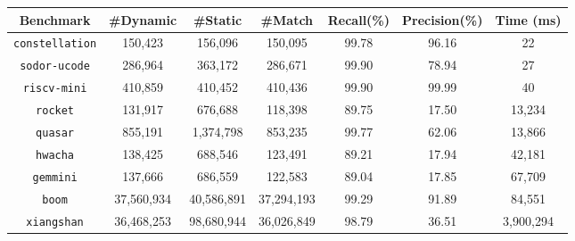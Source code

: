 \begin{tabular}{ccccccc}
\toprule
\textbf{Benchmark} & \textbf{\#Dynamic} & \textbf{\#Static} &  \textbf{\#Match} & \textbf{Recall(\%)} & \textbf{Precision(\%)} & \textbf{Time (ms)} \\
\midrule
\texttt{constellation} & 150,423 & 156,096 & 150,095 & 99.78 & 96.16 & 22 \\
\texttt{sodor-ucode} & 286,964 & 363,172 & 286,671 &  99.90 & 78.94 & 27\\
\texttt{riscv-mini} & 410,859 & 410,452 & 410,436 &  99.90  & 99.99 & 40\\
\texttt{rocket} & 131,917 & 676,688 & 118,398 & 89.75 &  17.50 & 13,234 \\
\texttt{quasar} & 855,191 & 1,374,798 & 853,235 &  99.77 & 62.06 & 13,866\\
\texttt{hwacha} & 138,425 & 688,546 & 123,491 & 89.21 & 17.94 & 42,181\\
\texttt{gemmini} & 137,666 & 686,559 & 122,583 & 89.04 & 17.85 & 67,709\\
\texttt{boom} & 37,560,934 & 40,586,891 & 37,294,193 & 99.29 & 91.89 &  84,551 \\
\texttt{xiangshan} & 36,468,253 & 98,680,944 & 36,026,849 &  98.79 & 36.51 & 3,900,294 \\
\bottomrule
\end{tabular}


